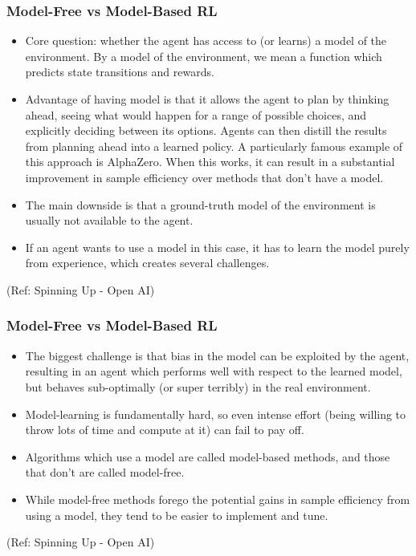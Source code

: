 \begin{frame}[fragile]\frametitle{Model-Free vs Model-Based RL}

\begin{itemize}
\item Core question: whether the agent has access to (or learns) a model of the environment. By a model of the environment, we mean a function which predicts state transitions and rewards.
\item Advantage of having model is that it allows the agent to plan by thinking ahead, seeing what would happen for a range of possible choices, and explicitly deciding between its options. Agents can then distill the results from planning ahead into a learned policy. A particularly famous example of this approach is AlphaZero. When this works, it can result in a substantial improvement in sample efficiency over methods that don't have a model.
\item The main downside is that a ground-truth model of the environment is usually not available to the agent. 
\item If an agent wants to use a model in this case, it has to learn the model purely from experience, which creates several challenges. 

\end{itemize}

{\tiny (Ref: Spinning Up - Open AI)}
\end{frame}

\begin{frame}[fragile]\frametitle{Model-Free vs Model-Based RL}

\begin{itemize}
\item The biggest challenge is that bias in the model can be exploited by the agent, resulting in an agent which performs well with respect to the learned model, but behaves sub-optimally (or super terribly) in the real environment. 
\item Model-learning is fundamentally hard, so even intense effort (being willing to throw lots of time and compute at it) can fail to pay off.
\item Algorithms which use a model are called model-based methods, and those that don't are called model-free. 
\item While model-free methods forego the potential gains in sample efficiency from using a model, they tend to be easier to implement and tune.
\end{itemize}

{\tiny (Ref: Spinning Up - Open AI)}
\end{frame}

